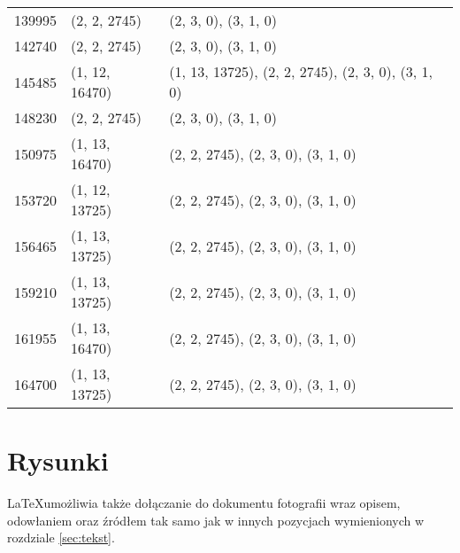 \begin{center}
\begin{longtable}{|l|l|l|}
139995 & (2, 2, 2745) & (2, 3, 0), (3, 1, 0) \\
142740 & (2, 2, 2745) & (2, 3, 0), (3, 1, 0) \\
145485 & (1, 12, 16470) & (1, 13, 13725), (2, 2, 2745), (2, 3, 0), (3, 1, 0) \\
148230 & (2, 2, 2745) & (2, 3, 0), (3, 1, 0) \\
150975 & (1, 13, 16470) & (2, 2, 2745), (2, 3, 0), (3, 1, 0) \\
153720 & (1, 12, 13725) & (2, 2, 2745), (2, 3, 0), (3, 1, 0) \\
156465 & (1, 13, 13725) & (2, 2, 2745), (2, 3, 0), (3, 1, 0) \\
159210 & (1, 13, 13725) & (2, 2, 2745), (2, 3, 0), (3, 1, 0) \\
161955 & (1, 13, 16470) & (2, 2, 2745), (2, 3, 0), (3, 1, 0) \\
164700 & (1, 13, 13725) & (2, 2, 2745), (2, 3, 0), (3, 1, 0) \\
\end{longtable}
\end{center}



\section{Rysunki}
\label{sec:rysunki}
\LaTeX umożliwia także dołączanie do dokumentu fotografii wraz opisem, odowłaniem oraz źródłem tak samo jak w innych pozycjach wymienionych w rozdziale \ref{sec:tekst}.


